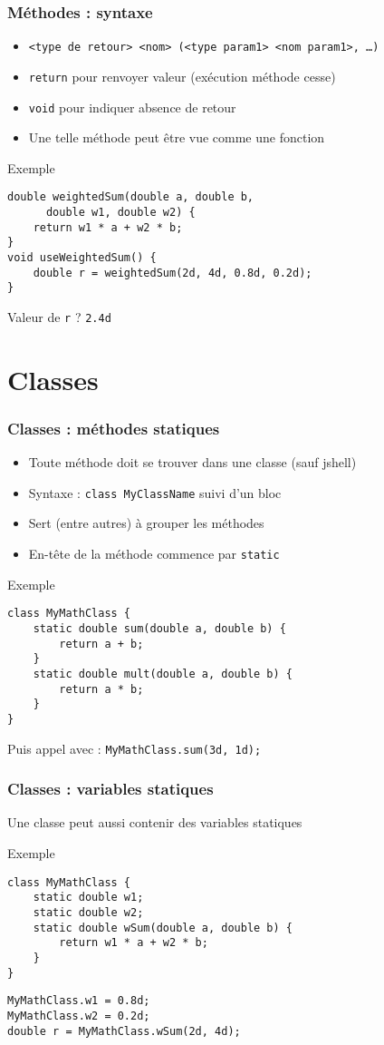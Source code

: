 \documentclass[english, french]{beamer}
\begin{document}
\begin{frame}[fragile]
	\frametitle{Méthodes : syntaxe}
	\begin{itemize}
		\item \texttt{<type de retour> <nom> (<type param1> <nom param1>, …)}
		\item \texttt{return} pour renvoyer valeur (exécution méthode cesse)
		\item \texttt{void} pour indiquer absence de retour
		\item Une telle méthode peut être vue comme une fonction
	\end{itemize}
	\begin{block}{Exemple}
		\begin{lstlisting}[tabsize=1]
double weightedSum(double a, double b, 
      double w1, double w2) {
	return w1 * a + w2 * b;
}
void useWeightedSum() {
	double r = weightedSum(2d, 4d, 0.8d, 0.2d);
}
		\end{lstlisting}	
	\end{block}
	Valeur de \texttt{r} ? \pause \texttt{2.4d}
\end{frame}

\section{Classes}
\begin{frame}[fragile]
	\frametitle{Classes : méthodes statiques}
	\begin{itemize}
		\item Toute méthode doit se trouver dans une classe (sauf jshell)
		\item Syntaxe : \texttt{class MyClassName} suivi d’un bloc
		\item Sert (entre autres) à grouper les méthodes
		\item En-tête de la méthode commence par \texttt{static}
	\end{itemize}
	\begin{block}{Exemple}
		\vspace{-0.5ex}
		\begin{lstlisting}
class MyMathClass {
	static double sum(double a, double b) {
		return a + b;
	}
	static double mult(double a, double b) {
		return a * b;
	}
}
		\end{lstlisting}	
	\end{block}
	Puis appel avec : \texttt{MyMathClass.sum(3d, 1d);}
\end{frame}

\begin{frame}[fragile]
	\frametitle{Classes : variables statiques}
	Une classe peut aussi contenir des variables statiques
	\begin{block}{Exemple}
		\begin{lstlisting}
class MyMathClass {
	static double w1;
	static double w2;
	static double wSum(double a, double b) {
		return w1 * a + w2 * b;
	}
}
		\end{lstlisting}	
	\end{block}
	\begin{lstlisting}
MyMathClass.w1 = 0.8d;
MyMathClass.w2 = 0.2d;
double r = MyMathClass.wSum(2d, 4d);
	\end{lstlisting}
\end{frame}
\end{document}
